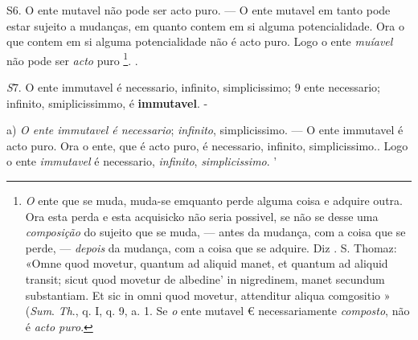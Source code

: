 S6. O ente mutavel não pode ser acto puro. --- O ente mutavel em tanto pode estar sujeito a mudanças, em quanto contem em si alguma potencialidade. Ora o que contem em si alguma potencialidade não é acto puro. Logo o ente \emph{muíavel} não pode ser \emph{acto} puro \footnote{\emph{O} ente que se muda, muda-se emquanto perde alguma coisa e adquire outra. Ora esta perda e esta acquisicko não seria possivel, se não se desse uma \emph{composição} do sujeito que se muda, --- antes da mudança, com a coisa que se perde, --- \emph{depois} da mudança, com a coisa que se adquire. Diz . S. Thomaz: «Omne quod movetur, quantum ad aliquid manet, et quantum ad aliquid transit; sicut quod movetur de albedine' in nigredinem, manet secundum substantiam. Et sic in omni quod movetur, attenditur aliqua comgositio » (\emph{Sum}. \emph{Th}., q. I, q. 9, a. 1. Se \emph{o} ente mutavel € necessariamente \emph{composto}, não é \emph{acto puro}.}. .

\emph{S}7. O ente immutavel é necessario, infinito, simplicissimo; \textbar{} 9 ente necessario; infinito, smiplicissimmo, é \textbf{immutavel}. -

a) \emph{O ente immutavel é necessario}; \emph{infinito}, simplicissimo. --- O ente immutavel é acto puro. Ora o ente, que é acto puro, é necessario, infinito, simplicissimo.. Logo o ente \emph{immutavel} é necessario, \emph{infinito}, \emph{simplicissimo}. '

